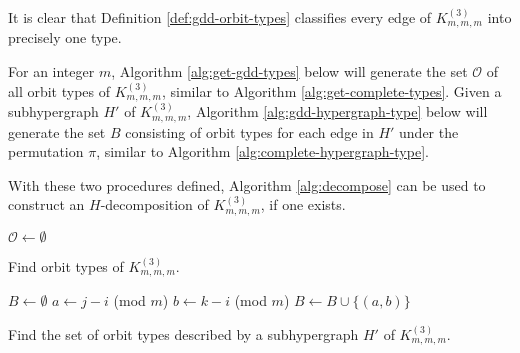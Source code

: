 It is clear that Definition \ref{def:gdd-orbit-types} classifies every edge of $K_{m,m,m}^{(3)}$ into precisely one type.

For an integer $m$, Algorithm \ref{alg:get-gdd-types} below will generate the set $\mathcal{O}$ of all orbit types of $K_{m,m,m}^{(3)}$, similar to Algorithm \ref{alg:get-complete-types}.
Given a subhypergraph $H'$ of $K_{m,m,m}^{(3)}$, Algorithm \ref{alg:gdd-hypergraph-type} below will generate the set $B$ consisting of orbit types for each edge in $H'$ under the permutation $\pi$, similar to Algorithm \ref{alg:complete-hypergraph-type}.

With these two procedures defined, Algorithm \ref{alg:decompose} can be used to construct an $H$-decomposition of $K_{m,m,m}^{(3)}$, if one exists.


\begin{algorithm}

$\mathcal{O} \gets \emptyset$\;


\;

\caption{Find orbit types of $K_{m,m,m}^{(3)}$.} \label{alg:get-gdd-types}
\end{algorithm}

\begin{algorithm}
$B \gets \emptyset$\;
 {
    $a \gets j-i$ (mod $m$)\;
    $b \gets k-i$ (mod $m$)\;
    $B \gets B \cup \{(a, b)\}$\;
}
\;
\caption{Find the set of orbit types described by a subhypergraph $H'$ of $K_{m,m,m}^{(3)}$.} \label{alg:gdd-hypergraph-type}
\end{algorithm}

\newpage
